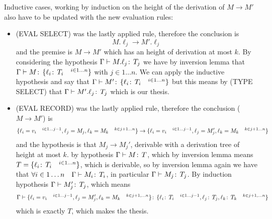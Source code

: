 Inductive cases, working by induction on the height of the derivation
of \(M \to M'\) also have to be updated with the new evaluation rules:
\begin{itemize}
\item (EVAL SELECT) was the lastly applied rule, therefore the
  conclusion is \[M.\ell_j \to M'.\ell_j\] and the premise is \(M\to
  M'\) which has an height of derivation at most \(k\). By considering
  the hypothesis \(\Gamma\vdash M.\ell_j \!:\,T_j\) we have by
  inversion lemma that \(\Gamma\vdash M \!:\,\{\ell_i \!:\,T_i
      \quad^{i \in 1 \dots n}\}\) with \(j\in 1\dots n\). We can apply
  the inductive hypothesis and say that \(\Gamma\vdash M'
  \!:\,\{\ell_i \!:\,T_i \quad^{i \in 1 \dots n}\}\) but this
  means by (TYPE SELECT) that \(\Gamma \vdash M'.\ell_j \!:\,T_j\)
  which is our thesis.
\item (EVAL RECORD) was the lastly applied rule, therefore the
  conclusion (\(M \to M'\)) is \[\{\ell_i = v_i \quad^{i\in 1\dots
      j-1}, \ell_j = M_j, \ell_k = M_k \quad^{k\in j+1\dots n}\} \to
  \{ \ell_i = v_i \quad^{i\in 1\dots j-1}, \ell_j = M_j', \ell_k =
    M_k \quad^{k\in j+1\dots n}\}\] and the hypothesis is that \(M_j\to
  M_j'\), derivable with a derivation tree of height at most \(k\). by
  hypothesis \(\Gamma \vdash M \!:\,T\), which by inversion lemma
  means \(T = \{\ell_i \!:\,T_i \quad^{i \in 1 \dots n}\}\), which
  is derivable, so by inversion lemma again we have that \(\forall i
  \in 1 \dots n \quad \Gamma\vdash M_i \!:\,T_i\), in particular
  \(\Gamma \vdash M_j \!:\,T_j\). By induction hypothesis \(\Gamma
  \vdash M_j' \!:\,T_j\), which means \[\Gamma \vdash \{\ell_i =
    v_i \quad^{i\in 1 \dots j-1}, \ell_j = M_j', \ell_k = M_k
    \quad^{k\in j+1, \dots n}\} \!:\,\{\ell_i \!:\,T_i
      \quad^{i\in 1 \dots j-1}, \ell_j \!:\,T_j, \ell_k \!:\,T_k
      \quad^{k\in j+1, \dots n}\}\] which is exactly \(T\), which
  makes the thesis.
\end{itemize}
